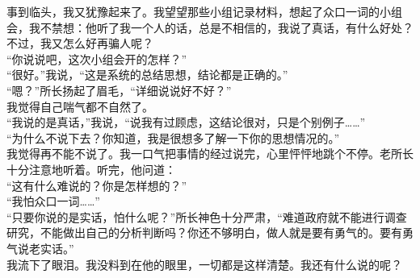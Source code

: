 事到临头，我又犹豫起来了。我望望那些小组记录材料，想起了众口一词的小组会，我不禁想：他听了我一个人的话，总是不相信的，我说了真话，有什么好处？不过，我又怎么好再骗人呢？\\

“你说说吧，这次小组会开的怎样？”\\

“很好。”我说，“这是系统的总结思想，结论都是正确的。”\\

“嗯？”所长扬起了眉毛，“详细说说好不好？”\\

我觉得自己喘气都不自然了。\\

“我说的是真话，”我说，“说我有过顾虑，这结论很对，只是个别例子……”\\

“为什么不说下去？你知道，我是很想多了解一下你的思想情况的。”\\

我觉得再不能不说了。我一口气把事情的经过说完，心里怦怦地跳个不停。老所长十分注意地听着。听完，他问道：\\

“这有什么难说的？你是怎样想的？”\\

“我怕众口一词……”\\

“只要你说的是实话，怕什么呢？”所长神色十分严肃，“难道政府就不能进行调查研究，不能做出自己的分析判断吗？你还不够明白，做人就是要有勇气的。要有勇气说老实话。”\\

我流下了眼泪。我没料到在他的眼里，一切都是这样清楚。我还有什么说的呢？
